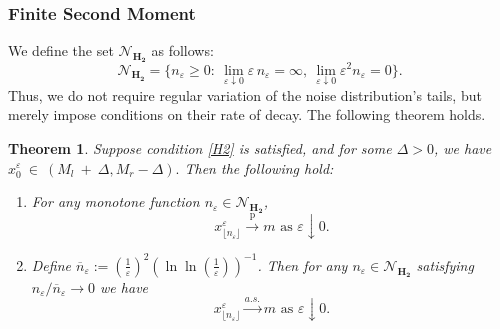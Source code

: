 \documentclass{article}
\makeatletter
\theoremstyle{plain}
\newtheorem{theorem}{Theorem}[section]
\theoremstyle{definition}
\theoremstyle{remark}
\newcommand{\e}[2][]{{\mathbb{E}_{#1}\left[ \, #2 \,\right] }} %
\newcommand{\ra }{ \rightarrow} %
\newcommand{\asra}{ \overset{\textit{{a.s.}}}{\longrightarrow}} %
\newcommand{\pra}{ \overset{\mathrm{p}}{\longrightarrow}} %
\def\namedlabel#1#2{\begingroup
    #2%
    \def\@currentlabel{#2}%
    \phantomsection\label{#1}\endgroup
}
\makeatother
\begin{document}
\subsubsection{Finite Second Moment}
We define the set $_{}$ as follows:
$$
\mathcal{N}_{\mathbf{H_2}} = \{ n_{\varepsilon} \geqslant 0 :~ \lim\limits_{\varepsilon\downarrow 0}\varepsilon\,n_\varepsilon=\infty,~ \lim\limits_{\varepsilon\downarrow 0}\varepsilon^2 n_\varepsilon = 0 \}.
$$
Thus, we do not require regular variation of the noise distribution's tails, but merely impose conditions on their rate of decay. The following theorem holds.
\begin{theorem} \label{t.2}
Suppose condition \ref{H2} is satisfied, and for some $\Delta >0$, we have $x_0^{\varepsilon}~\in~(M_{l}~+~\Delta, M_{r}-\Delta).$
Then the following hold:
\begin{enumerate}
    \item[\namedlabel{1_t.2}{$(1)$}] For any monotone function $n_\varepsilon \in {}_{}$,
    $$
    x_{\lfloor n_\varepsilon \rfloor}^{\varepsilon} \pra m \text{ as } \varepsilon\downarrow 0.    
    $$

    
 \item[\namedlabel{2_t.2}{$(2)$}] Define $_\varepsilon := \left(\right)^2 \left(\ln \ln \left(\right)\right)^{-1}$. Then  for any $n_\varepsilon \in {}_{}$ satisfying $n_\varepsilon  / _\varepsilon \ra 0$ we have
        $$
    x_{\lfloor n_\varepsilon \rfloor}^{\varepsilon} \asra m \text{ as } \varepsilon\downarrow 0.
    $$
    
\end{enumerate}
\end{theorem}
\end{document}

